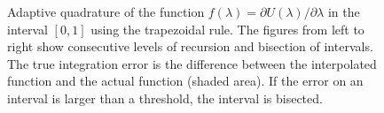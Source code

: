 \begin{figure}

  \caption{Adaptive quadrature of the function $f(\lambda) = \partial U(\lambda)/\partial \lambda$ in the interval $[0, 1]$ using the trapezoidal rule. The figures from left to right show consecutive levels of recursion and bisection of intervals. The true integration error is the difference between the interpolated function and the actual function (shaded area). If the error on an interval is larger than a threshold, the interval is bisected.}
  \label{fig:adaptive}
\end{figure}

